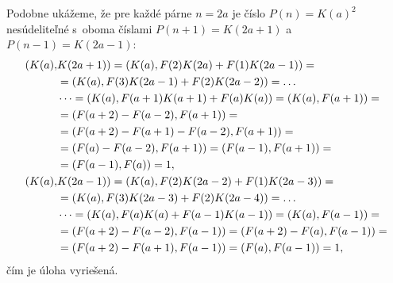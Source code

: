 {Podobne ukážeme, že pre každé párne $n=2a$ je číslo $P(n)=K(a)^2$ nesúdeliteľné s~oboma číslami $P(n+1)=K(2a+1)$ a~$P(n-1)=K(2a-1)$:
$$
\aligned
(K(a),&K(2a+1))=(K(a),F(2)K(2a)+F(1)K(2a-1))=\\
&=(K(a),F(3)K(2a-1)+F(2)K(2a-2))=\dots \\
&\dots =(K(a),F(a+1)K(a+1)+F(a)K(a))=(K(a),F(a+1))=\\
&=(F(a+2)-F(a-2),F(a+1))=\\
&=(F(a+2)-F(a+1)-F(a-2),F(a+1))=\\
&=(F(a)-F(a-2),F(a+1))=(F(a-1),F(a+1))=\\
&=(F(a-1),F(a))=1,\\
(K(a),&K(2a-1))=(K(a),F(2)K(2a-2)+F(1)K(2a-3))=\\
&=(K(a),F(3)K(2a-3)+F(2)K(2a-4))=\dots\\
&\dots=(K(a),F(a)K(a)+F(a-1)K(a-1))=(K(a),F(a-1))=\\
&=(F(a+2)-F(a-2),F(a-1))=(F(a+2)-F(a),F(a-1))=\\
&=(F(a+2)-F(a+1),F(a-1))=(F(a),F(a-1))=1,
\endaligned
$$
čím je úloha vyriešená.
}


